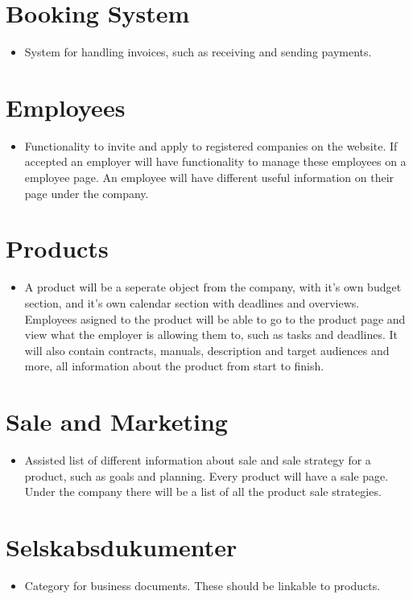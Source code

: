 \section{Booking System}
\begin{itemize}
	\item System for handling invoices, such as receiving and sending payments.
\end{itemize}

\section{Employees}
\begin{itemize}
	\item Functionality to invite and apply to registered companies on the website. If accepted an employer will have functionality to manage these employees on a employee page. An employee will have different useful information on their page under the company.
\end{itemize}

\section{Products}
\begin{itemize}
	\item A product will be a seperate object from the company, with it's own budget section, and it's own calendar section with deadlines and overviews. Employees asigned to the product will be able to go to the product page and view what the employer is allowing them to, such as tasks and deadlines. It will also contain contracts, manuals, description and target audiences and more, all information about the product from start to finish.
\end{itemize}

\section{Sale and Marketing}
\begin{itemize}
	\item Assisted list of different information about sale and sale strategy for a product, such as goals and planning. Every product will have a sale page. Under the company there will be a list of all the product sale strategies.
\end{itemize}

\section{Selskabsdukumenter}
\begin{itemize}
	\item Category for business documents. These should be linkable to products.
\end{itemize}
